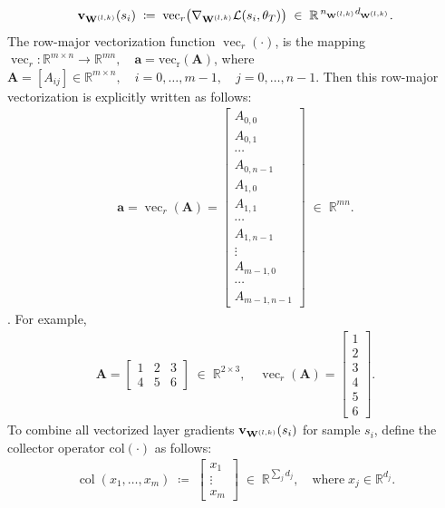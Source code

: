 \begin{align*}
    \mathbf{v}_{\mathbf{W}^{(l,k)}}(s_i)
    \;\coloneqq\;
    \operatorname{vec}_r\bigl(\nabla_{\mathbf{W}^{(l,k)}}\mathcal L(s_i,\theta_T)\bigr)
    \;\in\;\mathbb R^{\,n_{\mathbf{W}^{(l,k)}}d_{\mathbf{W}^{(l,k)}}}.
\end{align*}
The row-major vectorization function $\operatorname{vec}_r(\cdot)$, is the mapping $\operatorname{vec}_r:\mathbb{R}^{m \times n} \to \mathbb{R}^{mn}, \quad \mathbf{a} = \operatorname{vec_r}(\mathbf{A})$, where $\mathbf{A} = [A_{ij}] \in \mathbb{R}^{m \times n}, \quad i = 0, \ldots, m-1, \quad j = 0, \ldots, n-1$. Then this row-major vectorization is explicitly written as follows:
\begin{align*}
    \mathbf{a} = \operatorname{vec}_r(\mathbf A)=
    \begin{bmatrix}
    A_{0,0}\\ A_{0,1}\\ \cdots\\ A_{0,n-1}\\
    A_{1,0}\\ A_{1,1}\\ \cdots\\ A_{1,n-1}\\
    \vdots\\
    A_{m-1,0}\\ \cdots\\ A_{m-1,n-1}
    \end{bmatrix}
    \;\in\;\mathbb{R}^{mn}.
\end{align*}
\cite{DBLP:journals/corr/abs-2308-07928}. For example,
\begin{align*}
    \mathbf A=
    \begin{bmatrix}
    1 & 2 & 3\\
    4 & 5 & 6
    \end{bmatrix} \;\in\; \mathbb{R}^{2\times3}, 
    \quad 
    \operatorname{vec}_r(\mathbf A)=
    \begin{bmatrix}
    1\\2\\3\\4\\5\\6
    \end{bmatrix}.
\end{align*}
To combine all vectorized layer gradients $\mathbf{v}_{\mathbf{W}^{(l,k)}}(s_i)$ for sample $s_i$, define the collector operator $\operatorname{col(\cdot)}$ as follows:
\begin{align*}
    \operatorname{col}(x_1,\dots,x_m) \;\coloneqq\;
    \begin{bmatrix}
    x_1 \\ \vdots \\ x_m
    \end{bmatrix} \; \in \; \mathbb{R}^{\sum_{j}{d_j}}, \quad \text{where} \; x_j \in \mathbb{R}^{d_j}.
\end{align*}
